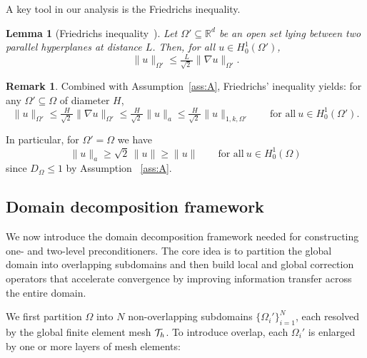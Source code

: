 \documentclass[preprint,3p,times]{elsarticle}
\newtheorem{lemma}[theorem]{Lemma}
\theoremstyle{definition}
\newtheorem{remark}[theorem]{Remark}
\numberwithin{equation}{section}
\begin{document}
\noindent
A key tool in our analysis is the Friedrichs inequality.

\begin{lemma}[Friedrichs inequality~{\cite[Theorem 13.19]{leoni:2017:FCSS}}]
\label{lem:friedrichs}
Let $\Omega'\subseteq\mathbb{R}^d$ be an open set lying between two parallel hyperplanes at distance $L$.  Then, for all $u\in H^1_0(\Omega')$,
\begin{equation}
	\|u\|_{\Omega'} \le \tfrac{L}{\sqrt{2}\,} \|\nabla u\|_{\Omega'}.
\end{equation}
\end{lemma}

\begin{remark}
Combined with Assumption~\ref{ass:A}, Friedrichs' inequality yields: for any $\Omega'\subseteq\Omega$ of diameter $H$,
\begin{equation}\label{eq:friedrichs_energy}
	\|u\|_{\Omega'} \le \tfrac{H}{\sqrt{2}\,} \|\nabla u\|_{\Omega'} 
	\le \tfrac{H}{\sqrt{2}\,} \|u\|_a
	\le \tfrac{H}{\sqrt{2}\,} \|u\|_{1, k,\Omega'} \qquad \text{for all} \ u\in H^1_0(\Omega').
\end{equation}

In particular, for $\Omega'=\Omega$ we have
\begin{equation}\label{eq:friedrichs_energy_Omega}
	\|u\|_a \ge \sqrt{2}\,\|u\| \ge \|u\| \qquad \text{for all} \ u\in H^1_0(\Omega)
\end{equation}
since $D_\Omega\le1$ by Assumption ~\ref{ass:A}.
\end{remark}

\subsection{Domain decomposition framework}

We now introduce the domain decomposition framework needed for constructing one- and two-level preconditioners. The core idea is to partition the global domain into overlapping subdomains and then build local and global correction operators that accelerate convergence by improving information transfer across the entire domain.

We first partition $\Omega$ into $N$ non-overlapping subdomains $\{\Omega_i'\}_{i=1}^N$, each resolved by the global finite element mesh ${\cal T}_h$. To introduce overlap, each $\Omega_i'$ is enlarged by one or more layers of mesh elements:
\end{document}
